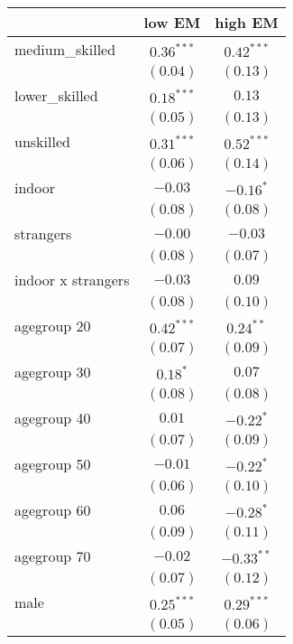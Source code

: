 
\begin{table}
\begin{center}
\begin{tabular}{l c c }
\hline
 & low EM & high EM \\
\hline
medium\_skilled    & $0.36^{***}$ & $0.42^{***}$  \\
                   & $(0.04)$     & $(0.13)$      \\
lower\_skilled     & $0.18^{***}$ & $0.13$        \\
                   & $(0.05)$     & $(0.13)$      \\
unskilled          & $0.31^{***}$ & $0.52^{***}$  \\
                   & $(0.06)$     & $(0.14)$      \\
indoor             & $-0.03$      & $-0.16^{*}$   \\
                   & $(0.08)$     & $(0.08)$      \\
strangers          & $-0.00$      & $-0.03$       \\
                   & $(0.08)$     & $(0.07)$      \\
indoor x strangers & $-0.03$      & $0.09$        \\
                   & $(0.08)$     & $(0.10)$      \\
agegroup 20        & $0.42^{***}$ & $0.24^{**}$   \\
                   & $(0.07)$     & $(0.09)$      \\
agegroup 30        & $0.18^{*}$   & $0.07$        \\
                   & $(0.08)$     & $(0.08)$      \\
agegroup 40        & $0.01$       & $-0.22^{*}$   \\
                   & $(0.07)$     & $(0.09)$      \\
agegroup 50        & $-0.01$      & $-0.22^{*}$   \\
                   & $(0.06)$     & $(0.10)$      \\
agegroup 60        & $0.06$       & $-0.28^{*}$   \\
                   & $(0.09)$     & $(0.11)$      \\
agegroup 70        & $-0.02$      & $-0.33^{**}$  \\
                   & $(0.07)$     & $(0.12)$      \\
male               & $0.25^{***}$ & $0.29^{***}$  \\
                   & $(0.05)$     & $(0.06)$      \\

\end{tabular}
\end{center}
\end{table}
